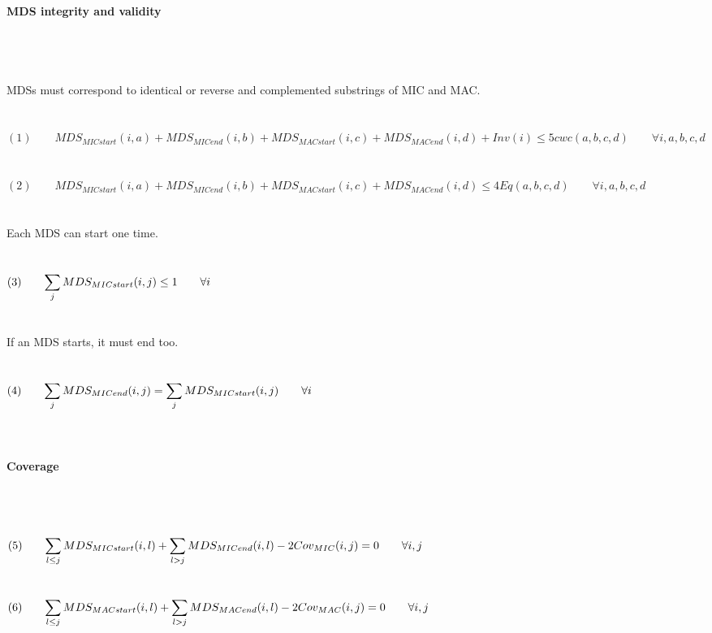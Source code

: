 \paragraph{MDS integrity and validity} $ $ \\\\\\
MDSs must correspond to identical or reverse and complemented substrings of MIC and MAC.
\\\\\\
$(1) \qquad MDS_{MICstart}(i,a) + MDS_{MICend}(i,b) + MDS_{MACstart}(i,c) + MDS_{MACend}(i,d) + Inv(i) \leq 5 cwc(a,b,c,d) \label{eq:someequation} \qquad \forall i,a,b,c,d$ \\\\\\
$(2) \qquad MDS_{MICstart}(i,a) + MDS_{MICend}(i,b) + MDS_{MACstart}(i,c) + MDS_{MACend}(i,d) \leq 4 Eq(a,b,c,d) \qquad \forall i,a,b,c,d $ \\\\\\
Each MDS can start one time. \\\\\\
$(3) \qquad \mathlarger{\sum_{j} MDS_{MICstart}(i,j)\leq 1 \qquad \forall i}$ \\\\\\
If an MDS starts, it must end too. \\\\\\
$(4) \qquad \mathlarger{\sum_{j} MDS_{MICend}(i,j) = \sum_{j} MDS_{MICstart}(i,j) \qquad \forall i}$ \\\\\\

\paragraph{Coverage} $ $
\\\\\\
$(5) \qquad \mathlarger{\sum_{l\leq j} MDS_{MICstart}(i,l) + \sum_{l>j}MDS_{MICend}(i,l) - 2Cov_{MIC}(i,j) = 0} \qquad \forall i,j $ \\\\\\
$(6) \qquad \mathlarger{\sum_{l\leq j} MDS_{MACstart}(i,l) + \sum_{l> j}MDS_{MACend}(i,l) - 2Cov_{MAC}(i,j) = 0} \qquad \forall i,j $ \\\\\\

